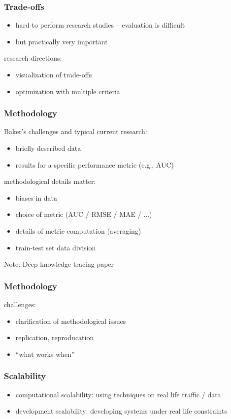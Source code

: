 \documentclass[bigger]{beamer}
\begin{document}
\begin{frame}
  \frametitle{Trade-offs}

  \begin{itemize}
  \item hard to perform research studies -- evaluation is difficult
  \item but practically very important
  \end{itemize}

  research directions:
  \begin{itemize}
  \item visualization of trade-offs
  \item optimization with multiple criteria
  \end{itemize}
\end{frame}

\begin{frame}
  \frametitle{Methodology}

  Baker's challenges and typical current research:
  \begin{itemize}
  \item briefly described data
  \item results for a specific performance metric (e.g., AUC)
  \end{itemize}

  methodological details matter:
  \begin{itemize}
  \item biases in data
  \item choice of metric (AUC / RMSE / MAE / ...)
  \item details of metric computation (averaging)
  \item train-test set data division
  \end{itemize}

  Note: Deep knowledge tracing paper
\end{frame}

\begin{frame}
  \frametitle{Methodology}

  challenges:
  \begin{itemize}
  \item clarification of methodological issues
  \item replication, reproducation
  \item ``what works when''
  \end{itemize}
\end{frame}

\begin{frame}
  \frametitle{Scalability}

  \begin{itemize}
  \item computational scalability: using techniques on real life traffic / data
  \item development scalability: developing systems under real life constraints
  \end{itemize}
\end{frame}
\end{document}
